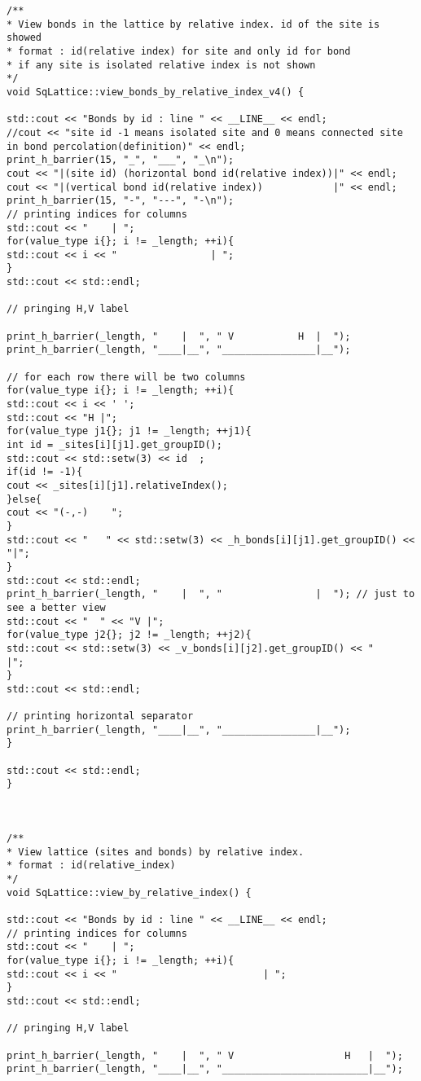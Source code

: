 \begin{lstlisting}[style=CStyle]
/**
* View bonds in the lattice by relative index. id of the site is showed
* format : id(relative index) for site and only id for bond
* if any site is isolated relative index is not shown
*/
void SqLattice::view_bonds_by_relative_index_v4() {

std::cout << "Bonds by id : line " << __LINE__ << endl;
//cout << "site id -1 means isolated site and 0 means connected site in bond percolation(definition)" << endl;
print_h_barrier(15, "_", "___", "_\n");
cout << "|(site id) (horizontal bond id(relative index))|" << endl;
cout << "|(vertical bond id(relative index))            |" << endl;
print_h_barrier(15, "-", "---", "-\n");
// printing indices for columns
std::cout << "    | ";
for(value_type i{}; i != _length; ++i){
std::cout << i << "                | ";
}
std::cout << std::endl;

// pringing H,V label

print_h_barrier(_length, "    |  ", " V           H  |  ");
print_h_barrier(_length, "____|__", "________________|__");

// for each row there will be two columns
for(value_type i{}; i != _length; ++i){
std::cout << i << ' ';
std::cout << "H |";
for(value_type j1{}; j1 != _length; ++j1){
int id = _sites[i][j1].get_groupID();
std::cout << std::setw(3) << id  ;
if(id != -1){
cout << _sites[i][j1].relativeIndex();
}else{
cout << "(-,-)    ";
}
std::cout << "   " << std::setw(3) << _h_bonds[i][j1].get_groupID() << "|";
}
std::cout << std::endl;
print_h_barrier(_length, "    |  ", "                |  "); // just to see a better view
std::cout << "  " << "V |";
for(value_type j2{}; j2 != _length; ++j2){
std::cout << std::setw(3) << _v_bonds[i][j2].get_groupID() << "               |";
}
std::cout << std::endl;

// printing horizontal separator
print_h_barrier(_length, "____|__", "________________|__");
}

std::cout << std::endl;
}



/**
* View lattice (sites and bonds) by relative index.
* format : id(relative_index)
*/
void SqLattice::view_by_relative_index() {

std::cout << "Bonds by id : line " << __LINE__ << endl;
// printing indices for columns
std::cout << "    | ";
for(value_type i{}; i != _length; ++i){
std::cout << i << "                         | ";
}
std::cout << std::endl;

// pringing H,V label

print_h_barrier(_length, "    |  ", " V                   H   |  ");
print_h_barrier(_length, "____|__", "_________________________|__");


\end{lstlisting}
